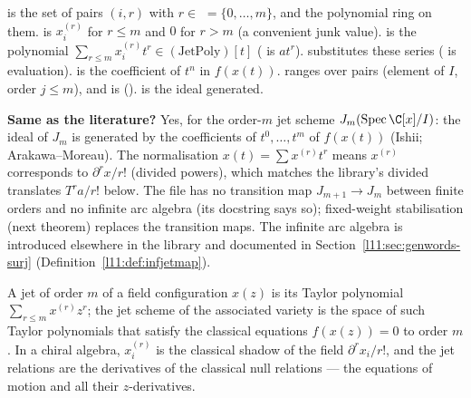 \begin{dictionary}
 is the set of pairs $(i,r)$ with $r\in$  $=\{0,\dots,m\}$, and 
the polynomial ring on them.  is $x_i^{(r)}$ for $r\le m$ and $0$ for $r>m$ (a convenient
junk value).  is the polynomial $\sum_{r\le m}x_i^{(r)}t^r\in(\text{JetPoly})[t]$
(\allowbreak{} is $at^r$).  substitutes these series (
is evaluation).  is the coefficient of $t^n$ in $f(x(t))$.  ranges over
pairs (element of $I$, order $j\le m$), and  is 
().  is the ideal generated.

\textbf{Same as the literature?} Yes, for the order-$m$ jet scheme $J_m(\operatorname{Spec}\C[x]/I)$: the ideal of
$J_m$ is generated by the coefficients of $t^0,\dots,t^m$ of $f(x(t))$ (Ishii; Arakawa--Moreau). The normalisation
$x(t) = \sum x^{(r)}t^r$ means $x^{(r)}$ corresponds to $\partial^rx/r!$ (divided powers), which matches the library's
divided translates $T^r a/r!$ below. The file  has no transition map $J_{m+1}\to J_m$ between finite orders and no
infinite arc algebra (its docstring says so); fixed-weight stabilisation (next theorem) replaces the transition maps. The
infinite arc algebra  is introduced elsewhere in the library and documented in
Section~\ref{l11:sec:genwords-surj} (Definition~\ref{l11:def:infjetmap}).
\end{dictionary}

\begin{physics}
A jet of order $m$ of a field configuration $x(z)$ is its Taylor polynomial $\sum_{r\le m}x^{(r)}z^r$; the jet
scheme of the associated variety is the space of such Taylor polynomials that satisfy the classical equations
$f(x(z)) = 0$ to order $m$. In a chiral algebra, $x_i^{(r)}$ is the classical shadow of the field
$\partial^rx_i/r!$, and the jet relations are the derivatives of the classical null relations --- the equations of
motion and all their $z$-derivatives.
\end{physics}

